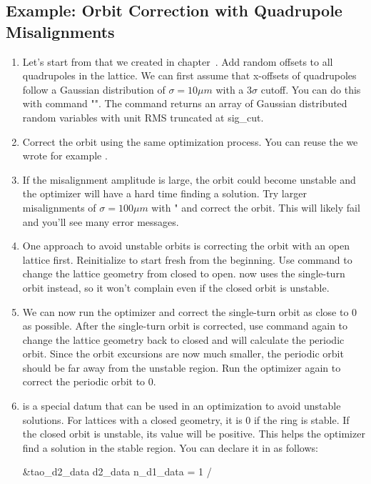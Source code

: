 \documentclass{hitec}     %
\begin{document}
{{{{%
\subsection{Example: Orbit Correction with Quadrupole Misalignments}
\begin{enumerate}[leftmargin=*]
\item Let's start from  that we created in chapter~. Add random offsets to all quadrupoles in the lattice. We can first assume that x-offsets of quadrupoles follow a Gaussian distribution of $\sigma=10\unit{\mu m}$ with a $3\sigma$ cutoff. You can do this with \tao command "". The  command returns an array of Gaussian distributed random variables with unit RMS truncated at sig\_cut.
%
\item Correct the orbit using the same optimization process. You can reuse the  we wrote for example .
%
\item If the misalignment amplitude is large, the orbit could become unstable and the optimizer will have a hard time finding a solution. Try larger misalignments of $\sigma=100\unit{\mu m}$ with " and correct the orbit. This will likely fail and you'll see many error messages.
%
\item One approach to avoid unstable orbits is correcting the orbit with an open lattice first. Reinitialize \tao to start fresh from the beginning. Use command  to change the lattice geometry from closed to open. \tao now uses the single-turn orbit instead, so it won't complain even if the closed orbit is unstable. 
%
\item We can now run the optimizer and correct the single-turn orbit as close to 0 as possible. After the single-turn orbit is corrected, use command  again to change the lattice geometry back to closed and \tao will calculate the periodic orbit. Since the orbit excursions are now much smaller, the periodic orbit should be far away from the unstable region. Run the optimizer again to correct the periodic orbit to 0.
%
\item {} is a special datum that can be used in an optimization to avoid unstable solutions. For lattices with a closed geometry,  it is 0 if the ring is stable. If the closed orbit is unstable, its value will be positive. This helps the optimizer find a solution in the stable region. You can declare it in  as follows:
\begin{code}
&tao_d2_data
  	d2_data%
  	n_d1_data = 1
/


\end{code}
\end{enumerate}}}}}
\end{document}
